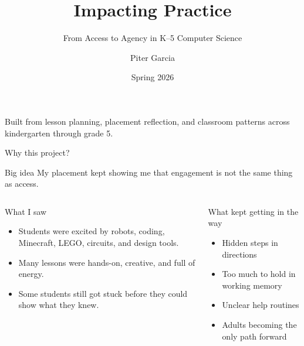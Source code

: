 \documentclass[aspectratio=169,11pt]{beamer}
\title{Impacting Practice}
\subtitle{From Access to Agency in K--5 Computer Science}
\author{Piter Garcia}
\institute{EDU 442 \\ Teaching Placement at Pine Brook IGNITE}
\date{Spring 2026}
\newcommand{\claimbox}[1]{
  \begin{block}{Big idea}
  \Large #1
  \end{block}
}
\begin{document}
\begin{frame}
  \titlepage
  \vspace{0.15cm}
  {\small Built from lesson planning, placement reflection, and classroom patterns across kindergarten through grade 5.}
\end{frame}

\begin{frame}{Why this project?}
\claimbox{My placement kept showing me that engagement is not the same thing as access.}

\begin{columns}[T]
  \begin{block}{What I saw}
  \begin{itemize}
    \item Students were excited by robots, coding, Minecraft, LEGO, circuits, and design tools.
    \item Many lessons were hands-on, creative, and full of energy.
    \item Some students still got stuck before they could show what they knew.
  \end{itemize}
  \end{block}

  \begin{block}{What kept getting in the way}
  \begin{itemize}
    \item Hidden steps in directions
    \item Too much to hold in working memory
    \item Unclear help routines
    \item Adults becoming the only path forward
  \end{itemize}
  \end{block}
\end{columns}
\end{frame}
\end{document}
